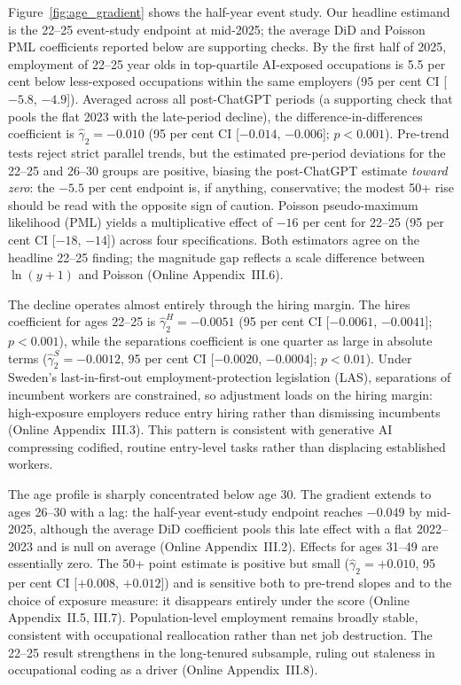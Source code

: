 \documentclass[preprint,12pt,authoryear]{elsarticle}
\begin{document}
Figure~\ref{fig:age_gradient} shows the half-year event study. Our headline estimand is the 22--25 event-study endpoint at mid-2025; the average DiD and Poisson PML coefficients reported below are supporting checks. By the first half of 2025, employment of 22--25 year olds in top-quartile AI-exposed occupations is 5.5 per cent below less-exposed occupations within the same employers (95 per cent CI [$-5.8$, $-4.9$]). Averaged across all post-ChatGPT periods (a supporting check that pools the flat 2023 with the late-period decline), the difference-in-differences coefficient is $\hat\gamma_2 = -0.010$ (95 per cent CI [$-0.014$, $-0.006$]; $p < 0.001$). Pre-trend tests reject strict parallel trends, but the estimated pre-period deviations for the 22--25 and 26--30 groups are positive, biasing the post-ChatGPT estimate \emph{toward zero}: the $-5.5$ per cent endpoint is, if anything, conservative; the modest 50+ rise should be read with the opposite sign of caution. Poisson pseudo-maximum likelihood (PML) yields a multiplicative effect of $-16$ per cent for 22--25 (95 per cent CI [$-18$, $-14$]) across four specifications. Both estimators agree on the headline 22--25 finding; the magnitude gap reflects a scale difference between $\ln(y+1)$ and Poisson (Online Appendix~III.6).

The decline operates almost entirely through the hiring margin. The hires coefficient for ages 22--25 is $\hat\gamma_2^H = -0.0051$ (95 per cent CI [$-0.0061$, $-0.0041$]; $p < 0.001$), while the separations coefficient is one quarter as large in absolute terms ($\hat\gamma_2^S = -0.0012$, 95 per cent CI [$-0.0020$, $-0.0004$]; $p < 0.01$). Under Sweden's last-in-first-out employment-protection legislation (LAS), separations of incumbent workers are constrained, so adjustment loads on the hiring margin: high-exposure employers reduce entry hiring rather than dismissing incumbents (Online Appendix~III.3). This pattern is consistent with generative AI compressing codified, routine entry-level tasks rather than displacing established workers.

The age profile is sharply concentrated below age 30. The gradient extends to ages 26--30 with a lag: the half-year event-study endpoint reaches $-0.049$ by mid-2025, although the average DiD coefficient pools this late effect with a flat 2022--2023 and is null on average (Online Appendix~III.2). Effects for ages 31--49 are essentially zero. The 50+ point estimate is positive but small ($\hat\gamma_2 = +0.010$, 95 per cent CI [$+0.008$, $+0.012$]) and is sensitive both to pre-trend slopes and to the choice of exposure measure: it disappears entirely under the \citet{eloundou2024gpts} score (Online Appendix~II.5, III.7). Population-level employment remains broadly stable, consistent with occupational reallocation rather than net job destruction. The 22--25 result strengthens in the long-tenured subsample, ruling out staleness in occupational coding as a driver (Online Appendix~III.8).
\end{document}
